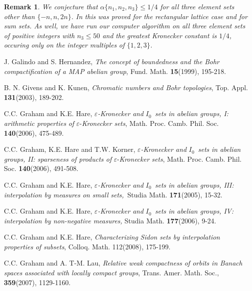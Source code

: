 \documentclass{amsart}
\newtheorem{remark}{Remark}
\begin{document}
\begin{remark}
We conjecture that $\alpha \{n_{1},n_{2},n_{3}\}\leq 1/4$ for all three
element sets other than $\{-n,n,2n\}$.  In \cite{HR} this was proved for the rectangular lattice case and for sum sets. As well, we have run our computer
algorithm on all three element sets of positive integers with $n_{3}\leq 50$
and the greatest Kronecker constant is $1/4$, occuring only on the integer
multiples of $\{1,2,3\}$. 
\end{remark}

\begin{thebibliography}{99}
 J. Galindo and S. Hernandez, \textit{The concept of boundedness
and the Bohr compactification of a MAP abelian group}, Fund. Math. \textbf{15}(1999), 195-218.

 B. N. Givens and K. Kunen, \textit{Chromatic numbers and Bohr
topologies}, Top. Appl. \textbf{131}(2003), 189-202.

 C.C. Graham and K.E. Hare, $\varepsilon $\textit{-Kronecker
and }$I_{0}$\textit{\ sets in abelian groups, I: arithmetic properties of }$\varepsilon $-\textit{Kronecker sets}, Math. Proc. Camb. Phil. Soc. \textbf{140}(2006), 475-489.

 C.C. Graham, K.E. Hare and T.W. Korner, $\varepsilon $\textit{-Kronecker and }$I_{0}$\textit{\ sets in abelian groups, II: sparseness of
products of }$\varepsilon $-\textit{Kronecker sets}, Math. Proc. Camb. Phil.
Soc. \textbf{140}(2006), 491-508.

 C.C. Graham and K.E. Hare, $\varepsilon $\textit{-Kronecker
and }$I_{0}$\textit{\ sets in abelian groups, III: interpolation by measures
on small sets,\ }Studia Math. \textbf{171}(2005), 15-32.

 C.C. Graham and K.E. Hare, $\varepsilon $\textit{-Kronecker
and }$I_{0}$\textit{\ sets in abelian groups, IV: interpolation by
non-negative measures, }Studia Math. \textbf{177}(2006), 9-24.

 C.C. Graham and K.E. Hare, \textit{Characterizing Sidon
sets by interpolation properties of subsets}, Colloq. Math. 112(2008),
175-199.

 C.C. Graham and A. T-M. Lau, \textit{Relative weak compactness
of orbits in Banach spaces associated with locally compact groups}, Trans.
Amer. Math. Soc., \textbf{359}(2007), 1129-1160.


\end{thebibliography}
\end{document}
